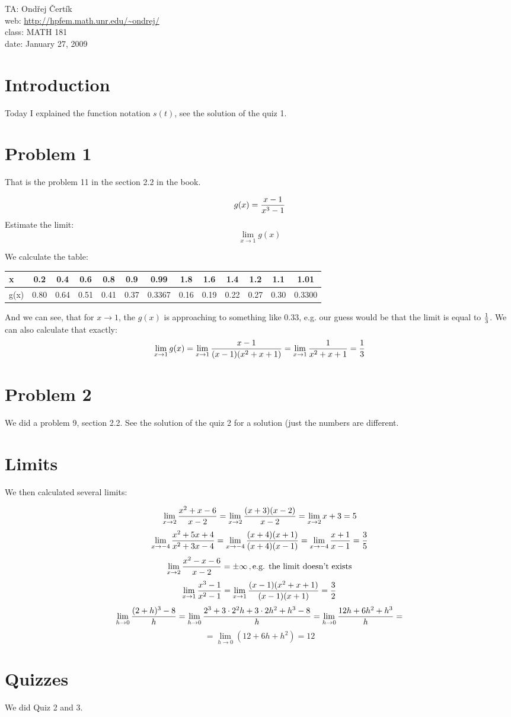 \documentclass[10pt]{article}
\begin{document}
\noindent TA: Ondřej Čertík\\
web: \url{http://hpfem.math.unr.edu/~ondrej/}\\
class: MATH 181\\
date: January 27, 2009

\section{Introduction}

Today I explained the function notation $s(t)$, see the solution of the quiz 1.

\section{Problem 1}

That is the problem 11 in the section 2.2 in the book.

$$g(x)={x-1\over x^3-1}$$
Estimate the limit:
$$\lim_{x\to1}g(x)$$

We calculate the table:

\begin{tabular}{|l||c|c|c|c|c|c|c|c|c|c|c|c|}
\hline
x & 0.2 & 0.4 & 0.6 & 0.8 & 0.9 & 0.99 & 1.8 & 1.6 & 1.4 & 1.2 & 1.1 & 1.01 \\ \hline
g(x) & 0.80 & 0.64 & 0.51 & 0.41 & 0.37 & 0.3367 & 0.16 & 0.19 & 0.22 & 0.27 & 0.30 & 0.3300\\
\hline
\end{tabular}
And we can see, that for $x\to1$, the $g(x)$ is approaching to something like
$0.33$, e.g. our guess would be that the limit is equal to $1\over 3$. We can
also calculate that exactly:
$$\lim_{x\to1}g(x)=\lim_{x\to1}{x-1\over (x-1)(x^2+x+1)}=\lim_{x\to1}{1\over x^2+x+1}={1\over3}$$

\section{Problem 2}

We did a problem 9, section 2.2. See the solution of the quiz 2 for a solution
(just the numbers are different.

\section{Limits}

We then calculated several limits:

$$\lim_{x\to2}{x^2+x-6\over x-2}=\lim_{x\to2}{(x+3)(x-2)\over x-2} =
\lim_{x\to2} x+ 3 = 5$$
$$\lim_{x\to-4}{x^2+5x+4\over x^2+3x-4} =
\lim_{x\to-4}{(x+4)(x+1)\over(x+4)(x-1)} = \lim_{x\to-4}{x+1\over x-1} =
{3\over 5}$$
$$\lim_{x\to2}{x^2-x-6\over x-2} = \pm\infty\,,\mbox{e.g. the limit doesn't
exists}$$
$$\lim_{x\to1}{x^3-1\over x^2-1} = \lim_{x\to1}{(x-1)(x^2+x+1)\over(x-1)(x+1)}
= {3\over2}$$
$$
\lim_{h\to0}{(2+h)^3-8\over h}
=\lim_{h\to0}{2^3+3\cdot2^2h+3\cdot2h^2+h^3-8\over h}
=\lim_{h\to0}{12h+6h^2+h^3\over h}
=
$$
$$
=\lim_{h\to0}(12+6h+h^2)
=12
$$

\section{Quizzes}

We did Quiz 2 and 3.
\end{document}
